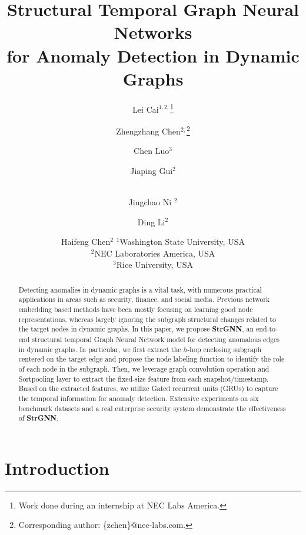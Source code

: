 \documentclass{article}
\title{Structural Temporal Graph Neural Networks\\ for Anomaly Detection in Dynamic Graphs}
\author{
Lei Cai$^{1,2,}$\thanks{Work done during an internship at NEC Labs America.}\and
Zhengzhang Chen$^{2,}$\thanks{Corresponding author: \{zchen\}@nec-labs.com.}\and
Chen Luo$^3$\and
Jiaping Gui$^2$\and\\
Jingchao Ni $^2$\and
Ding Li$^2$\and
Haifeng Chen$^2$ 
\affiliations
$^1$Washington State University, USA\\
$^2$NEC Laboratories America, USA\\
$^3$Rice University, USA\\
}
\author{

}
\newcommand{\model}{\textbf{StrGNN}~}
\newcommand{\modele}{\textbf{StrGNN}}
\begin{document}
\maketitle

\begin{abstract}
Detecting anomalies in dynamic graphs is a vital task, with numerous practical applications in areas such as security, finance, and social media. Previous network embedding based methods have been mostly focusing on learning good node representations, %
whereas largely ignoring the subgraph structural changes related to the target nodes in dynamic graphs. %
In this paper, we propose \modele, an end-to-end structural temporal Graph Neural Network model for detecting anomalous edges in dynamic graphs. In particular, we first extract the $h$-hop enclosing subgraph centered on the target edge and propose the node labeling function to identify the role of each node in the subgraph. Then, we leverage graph convolution operation and Sortpooling layer to extract the fixed-size feature from each snapshot/timestamp. Based on the extracted features, we utilize Gated recurrent units (GRUs) to capture the temporal information for anomaly detection. Extensive experiments on six benchmark datasets and a real enterprise security system demonstrate the effectiveness of \modele. %
\end{abstract}


\section{Introduction}


\end{document}
